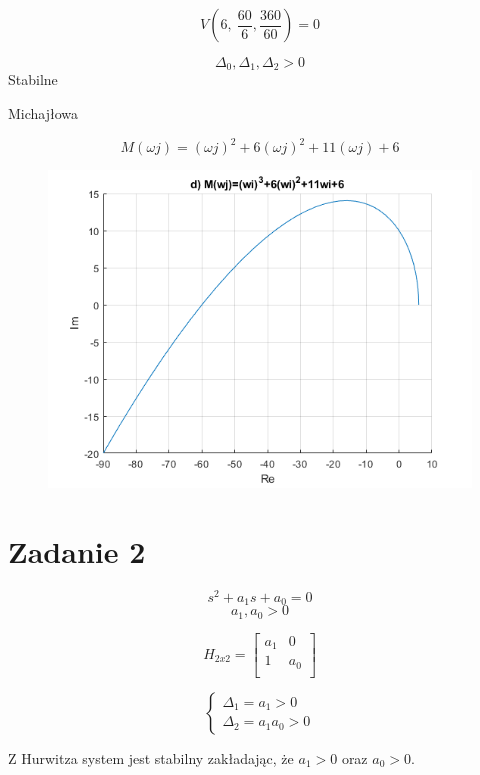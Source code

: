 \documentclass{article}
\begin{document}
\begin{itemize}
    $$ V\left(6, \ \frac{60}{6}, \frac{360}{60}\right)=0$$


    $$\Delta_{0}, \Delta_{1}, \Delta_{2}> 0$$ 
    Stabilne

    Michajłowa

    $$M(\omega j)=(\omega j)^{2}+6(\omega j )^{2}+11(\omega j)+6$$

    \begin{figure}
        \includegraphics[scale=0.5]{d.png}
        \centering
    \end{figure}

\end{itemize}

\newpage

\section*{Zadanie 2}

$$s^{2}+a_{1}s+a_{0}=0$$
$$a_{1}, a_{0} > 0$$

$$ H_{2x2}=
    \begin{bmatrix}
        a_{1}& 0\\
        1& a_{0}\\
    \end{bmatrix}$$

    \[\begin{cases}
        \Delta_{1}=a_{1} > 0\\
        \Delta_{2}=a_{1}a_{0} > 0
    \end{cases}\]

    Z Hurwitza system jest stabilny zakładając, że $a_{1}>0$ oraz $a_{0}>0$.
\end{document}
